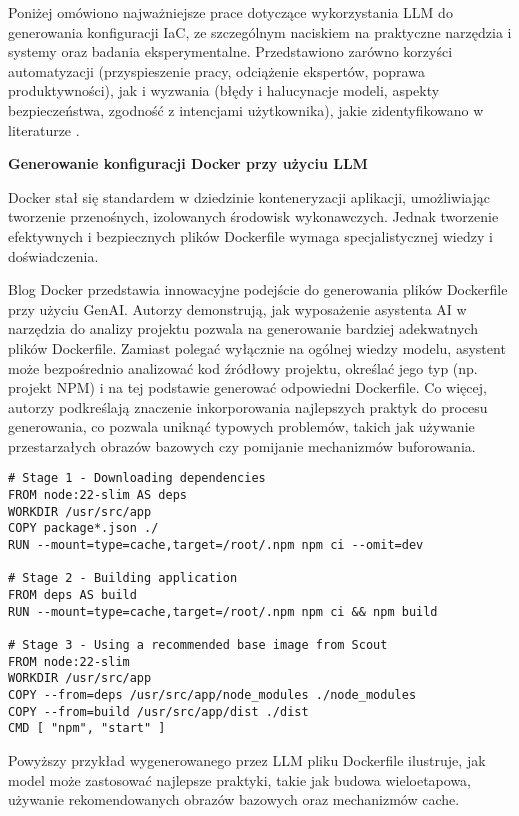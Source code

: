 Poniżej omówiono najważniejsze prace dotyczące wykorzystania LLM do generowania konfiguracji IaC, ze szczególnym naciskiem na praktyczne narzędzia i systemy oraz badania eksperymentalne. Przedstawiono zarówno korzyści automatyzacji (przyspieszenie pracy, odciążenie ekspertów, poprawa produktywności), jak i wyzwania (błędy i halucynacje modeli, aspekty bezpieczeństwa, zgodność z intencjami użytkownika), jakie zidentyfikowano w literaturze \cite{malul_genkubesec_2024, kratzke_dont_2024}.

\textbf{Generowanie konfiguracji Docker przy użyciu LLM}

Docker stał się standardem w dziedzinie konteneryzacji aplikacji, umożliwiając tworzenie przenośnych, izolowanych środowisk wykonawczych. Jednak tworzenie efektywnych i bezpiecznych plików Dockerfile wymaga specjalistycznej wiedzy i doświadczenia.

Blog Docker przedstawia innowacyjne podejście do generowania plików Dockerfile przy użyciu GenAI. Autorzy demonstrują, jak wyposażenie asystenta AI w narzędzia do analizy projektu pozwala na generowanie bardziej adekwatnych plików Dockerfile. Zamiast polegać wyłącznie na ogólnej wiedzy modelu, asystent może bezpośrednio analizować kod źródłowy projektu, określać jego typ (np. projekt NPM) i na tej podstawie generować odpowiedni Dockerfile. Co więcej, autorzy podkreślają znaczenie inkorporowania najlepszych praktyk do procesu generowania, co pozwala uniknąć typowych problemów, takich jak używanie przestarzałych obrazów bazowych czy pomijanie mechanizmów buforowania.

\begin{lstlisting}
# Stage 1 - Downloading dependencies
FROM node:22-slim AS deps
WORKDIR /usr/src/app
COPY package*.json ./
RUN --mount=type=cache,target=/root/.npm npm ci --omit=dev

# Stage 2 - Building application
FROM deps AS build
RUN --mount=type=cache,target=/root/.npm npm ci && npm build

# Stage 3 - Using a recommended base image from Scout
FROM node:22-slim
WORKDIR /usr/src/app
COPY --from=deps /usr/src/app/node_modules ./node_modules
COPY --from=build /usr/src/app/dist ./dist
CMD [ "npm", "start" ]    
\end{lstlisting}

Powyższy przykład wygenerowanego przez LLM pliku Dockerfile ilustruje, jak model może zastosować najlepsze praktyki, takie jak budowa wieloetapowa, używanie rekomendowanych obrazów bazowych oraz mechanizmów cache.

